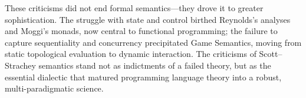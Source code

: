 \documentclass[11pt]{article}
\begin{document}
These criticisms did not end formal semantics---they drove it to greater sophistication. The
struggle with state and control birthed Reynolds's analyses and Moggi's monads, now central to
functional programming; the failure to capture sequentiality and concurrency precipitated Game
Semantics, moving from static topological evaluation to dynamic interaction. The criticisms of
Scott--Strachey semantics stand not as indictments of a failed theory, but as the essential
dialectic that matured programming language theory into a robust, multi-paradigmatic science.
\end{document}
